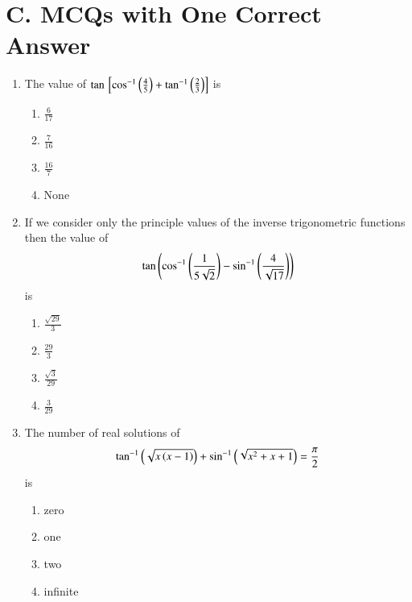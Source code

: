 \documentclass[journal,12pt,twocolumn,article]{IEEEtran}
\theoremstyle{remark}
\begin{document}
\section*{C. MCQs with One Correct Answer}
\begin{enumerate}
	\item The value of $\tan {}\left[ \cos ^{-1}\left(\frac{4}{5}\right)+\tan^{-1}\left(\frac{2}{3}\right) \right]$ is
\hfill {}
\begin{multicols}{2}
\begin{enumerate}
\item $\frac{6}{17}$
\item $\frac{7}{16}$
\columnbreak
\item $\frac{16}{7}$
\item None
\end{enumerate}
\end{multicols}
\item If we consider only the principle values of the inverse trigonometric functions then the value of
\begin{align*}
\tan \left(\cos ^{-1}\left(\frac{1}{5\sqrt{2}}\right)-\sin ^{-1}\left(\frac{4}{\sqrt{17}}\right)\right)
\end{align*}
is
\hfill {}
\begin{multicols}{2}
\begin{enumerate}
\item $\frac{\sqrt{29}}{3}$ 
\item $\frac{29}{3}$
\columnbreak
\item $\frac{\sqrt{3}}{29}$ 
\item $\frac{3}{29}$ 
\end{enumerate}
\end{multicols}
\item The number of real solutions of
\begin{align*}
\tan ^{-1}\left(\sqrt{x\left(x-1\right)}\right)+\sin ^{-1}\left(\sqrt{x^2+x+1}\right)=\frac{\pi}{2}
\end{align*}
is 
\hfill {}
\begin{multicols}{2}
\begin{enumerate}
\item zero 
\item one 
\columnbreak
\item two 
\item infinite\\\\
\end{enumerate}
\end{multicols}

\end{enumerate}
\end{document}
